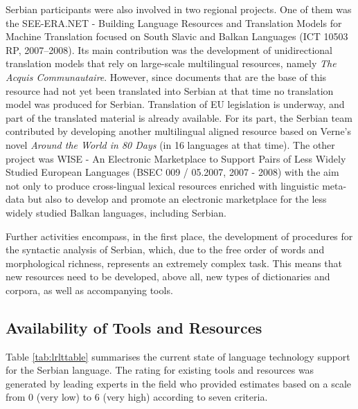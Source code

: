 \begin{multicols}{2}
Serbian participants were also involved in two regional projects. One of them was the SEE-ERA.NET - Building Language Resources and Translation Models for Machine Translation focused on South Slavic and Balkan Languages (ICT 10503 RP, 2007--2008). Its main contribution was the development of unidirectional translation models that rely on large-scale multilingual resources, namely \textit{The Acquis Communautaire}. However, since documents that are the base of this resource had not yet been translated into Serbian at that time no translation model was produced for Serbian. Translation of EU legislation is underway, and part of the translated material is already available. \cite{PREVODJENJE} For its part, the Serbian team contributed by developing another multilingual aligned resource based on Verne’s novel \textit{Around the World in 80 Days} (in 16 languages at that time).  The other project was WISE - An Electronic Marketplace to Support Pairs of Less Widely Studied European Languages (BSEC 009 / 05.2007, 2007 - 2008) with the aim not only to produce cross-lingual lexical resources enriched with linguistic meta-data but also to develop and promote an electronic marketplace for the less widely studied Balkan languages, including Serbian.

Further activities encompass, in the first place, the development of procedures for the syntactic analysis of Serbian, which, due to the free order of words and morphological richness, represents an extremely complex task. This means that new resources need to be developed, above all, new types of dictionaries and corpora, as well as accompanying tools.  


 \subsection {Availability of Tools and Resources}
   
 
Table \ref{tab:lrlttable} summarises the current state of language technology support for the Serbian language. The rating for existing tools and resources was generated by leading experts in the field who provided estimates based on a scale from 0 (very low) to 6 (very high) according to seven criteria.

\begin{table}[ht]
\centering


\end{table}
\end{multicols}

